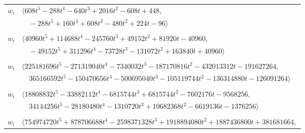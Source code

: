 \documentclass[11pt]{article}
\begin{document}
\begin{longtable}{@{}ll@{}}
$w_i$ & $\langle 608t^{5}-288t^{4}-640t^{3}+2016t^{2}-608t+448,$\\
 & $\quad -288t^{5}+160t^{4}+608t^{3}-480t^{2}+224t-96\rangle$\\
\addlinespace[2pt]
\multicolumn{2}{@{}p{0.97\textwidth}@{}}{$i=20$, $D_i=8192$, $\rho_{ij}$: $6{:}2, \allowbreak 14{:}2, \allowbreak 19{:}1, \allowbreak 25{:}1, \allowbreak 36{:}2, \allowbreak 57{:}2, \allowbreak 61{:}2, \allowbreak 66{:}1, \allowbreak 77{:}1$}\\
$w_i$ & $\langle 40960t^{5}+114688t^{4}-245760t^{3}+49152t^{2}+81920t-40960,$\\
 & $\quad -49152t^{5}+311296t^{4}-73728t^{3}-131072t^{2}+163840t+40960\rangle$\\
\addlinespace[2pt]
\multicolumn{2}{@{}p{0.97\textwidth}@{}}{$i=21$, $D_i=262144$, $\rho_{ij}$: $6{:}2, \allowbreak 10{:}2, \allowbreak 15{:}2, \allowbreak 30{:}2, \allowbreak 31{:}2, \allowbreak 35{:}1, \allowbreak 39{:}2, \allowbreak 45{:}1, \allowbreak 47{:}1, \allowbreak 51{:}1, \allowbreak 52{:}1, \allowbreak 75{:}2$}\\
$w_i$ & $\langle 225181696t^{5}-271319040t^{4}-7340032t^{3}-187170816t^{2}-432013312t-191627264,$\\
 & $\quad 365166592t^{5}-150470656t^{4}-500695040t^{3}-105119744t^{2}-136314880t-126091264\rangle$\\
\addlinespace[2pt]
\multicolumn{2}{@{}p{0.97\textwidth}@{}}{$i=22$, $D_i=65536$, $\rho_{ij}$: $5{:}2, \allowbreak 6{:}1, \allowbreak 9{:}2, \allowbreak 10{:}1, \allowbreak 14{:}1, \allowbreak 19{:}1, \allowbreak 28{:}1, \allowbreak 33{:}2, \allowbreak 34{:}2, \allowbreak 36{:}2, \allowbreak 37{:}1, \allowbreak 62{:}1, \allowbreak 75{:}1$}\\
$w_i$ & $\langle 18808832t^{5}-33882112t^{4}-6815744t^{3}+6815744t^{2}-7602176t-9568256,$\\
 & $\quad 34144256t^{5}-28180480t^{4}-1310720t^{3}+10682368t^{2}-6619136t-1376256\rangle$\\
\addlinespace[2pt]
\multicolumn{2}{@{}p{0.97\textwidth}@{}}{$i=23$, $D_i=1048576$, $\rho_{ij}$: $2{:}2, \allowbreak 4{:}1, \allowbreak 8{:}1, \allowbreak 10{:}2, \allowbreak 36{:}1, \allowbreak 46{:}2, \allowbreak 52{:}1, \allowbreak 53{:}2, \allowbreak 55{:}1, \allowbreak 57{:}2, \allowbreak 58{:}1, \allowbreak 60{:}1, \allowbreak 70{:}2, \allowbreak 75{:}1$}\\
$w_i$ & $\langle 754974720t^{5}+878706688t^{4}-2598371328t^{3}+1918894080t^{2}+1887436800t+381681664,$\\

\end{longtable}
\end{document}
